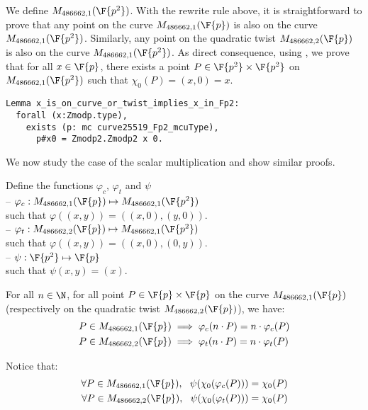 We define $M_{486662,1}(\F{p^2})$. With the rewrite rule above, it is straightforward
to prove that any point on the curve $M_{486662,1}(\F{p})$ is also on the curve
$M_{486662,1}(\F{p^2})$. Similarly, any point on the quadratic twist
$M_{486662,2}(\F{p})$ is also on the curve $M_{486662,1}(\F{p^2})$.
As direct consequence, using , we prove that for all
$x \in \F{p}$, there exists a point $P \in \F{p^2}\times\F{p^2}$ on
$M_{486662,1}(\F{p^2})$ such that $\chi_0(P) = (x,0) = x$.

\begin{lstlisting}[language=Coq]
Lemma x_is_on_curve_or_twist_implies_x_in_Fp2:
  forall (x:Zmodp.type),
    exists (p: mc curve25519_Fp2_mcuType),
      p#x0 = Zmodp2.Zmodp2 x 0.
\end{lstlisting}

We now study the case of the scalar multiplication and show similar proofs.
\begin{dfn}
Define the functions $\varphi_c$, $\varphi_t$ and $\psi$\\
-- $\varphi_c: M_{486662,1}(\F{p}) \mapsto M_{486662,1}(\F{p^2})$\\
  such that $\varphi((x,y)) = ((x,0), (y,0))$.\\
-- $\varphi_t: M_{486662,2}(\F{p}) \mapsto M_{486662,1}(\F{p^2})$\\
  such that $\varphi((x,y)) = ((x,0), (0,y))$.\\
-- $\psi: \F{p^2} \mapsto \F{p}$\\
  such that $\psi(x,y) = (x)$.
\end{dfn}

\begin{lemma}
  \label{lemma:proj}
  For all $n \in \N$, for all point $P\in\F{p}\times\F{p}$ on the curve
  $M_{486662,1}(\F{p})$ (respectively on the quadratic twist $M_{486662,2}(\F{p})$), we have:
  \begin{align*}
  P \in M_{486662,1}(\F{p}) &\implies \varphi_c(n \cdot P) = n \cdot \varphi_c(P)\\
  P \in M_{486662,2}(\F{p}) &\implies \varphi_t(n \cdot P) = n \cdot \varphi_t(P)
  \end{align*}
\end{lemma}
Notice that:
\begin{align*}
\forall P \in M_{486662,1}(\F{p}),\ \ \psi(\chi_0(\varphi_c(P))) = \chi_0(P)\\
\forall P \in M_{486662,2}(\F{p}),\ \ \psi(\chi_0(\varphi_t(P))) = \chi_0(P)
\end{align*}


